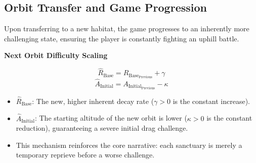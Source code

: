 \documentclass{article}
\newenvironment{mathbox}[1][\unskip]{
    \begin{tcolorbox}
    \textbf{#1}
}{
    \end{tcolorbox}
}
\begin{document}
\vspace{1em}
\subsection{Orbit Transfer and Game Progression}\hspace{0.5em}

Upon transferring to a new habitat, the game progresses to an inherently more challenging state, ensuring the player is constantly fighting an uphill battle.

\begin{mathbox}[\color{DeepVoid}Next Orbit Difficulty Scaling]
$$
\hat{R}_{\text{Base}} = R_{\text{Base}_{\text{Previous}}} + \gamma
$$
$$
\hat{A}_{\text{Initial}} = A_{\text{Initial}_{\text{Previous}}} - \kappa
$$
\end{mathbox}

\begin{itemize}
    \item $\hat{R}_{\text{Base}}$: The new, higher inherent decay rate ($\gamma > 0$ is the constant increase).
    \item $\hat{A}_{\text{Initial}}$: The starting altitude of the new orbit is lower ($\kappa > 0$ is the constant reduction), guaranteeing a severe initial drag challenge.
    \item This mechanism reinforces the core narrative: each sanctuary is merely a temporary reprieve before a worse challenge.
\end{itemize}
\end{document}
